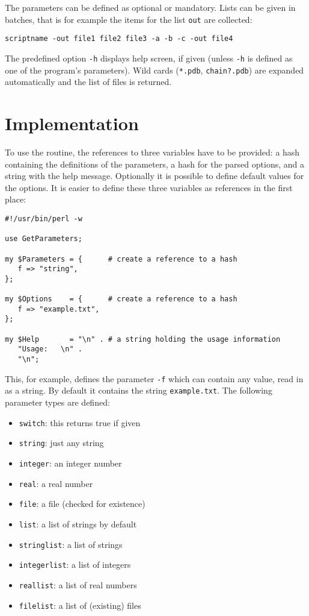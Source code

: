 \documentclass[12pt, a4paper]{article}
\begin{document}
The parameters can be defined as optional or mandatory. Lists can be given in batches, that is for example the items for the list \verb'out' are collected:
\begin{verbatim}
scriptname -out file1 file2 file3 -a -b -c -out file4
\end{verbatim}

The predefined option \verb'-h' displays help screen, if given (unless \verb'-h' is defined as one of the program's parameters).  Wild cards (\verb'*.pdb', \verb'chain?.pdb') are expanded automatically and the list of files is returned.



\newpage

\section{Implementation}

To use the routine, the references to three variables have to be provided: a hash containing the definitions of the parameters, a hash for the parsed options, and a string with the help message. Optionally it is possible to define default values for the options. It is easier to define these three variables as references in the first place:


\begin{verbatim}
#!/usr/bin/perl -w

use GetParameters;

my $Parameters = {      # create a reference to a hash
   f => "string",
};

my $Options    = {      # create a reference to a hash
   f => "example.txt",
};

my $Help       = "\n" . # a string holding the usage information
   "Usage:   \n" .
   "\n";

\end{verbatim}

This, for example, defines the parameter \verb'-f' which can contain any value, read in as a string. By default it contains the string \verb'example.txt'. The following parameter types are defined:

\begin{itemize}
\item \verb'switch':  this returns true if given
\item \verb'string': just any string
\item \verb'integer': an integer number
\item \verb'real': a real number
\item \verb'file': a file (checked for existence)
\item \verb'list': a list of strings by default
\item \verb'stringlist': a list of strings
\item \verb'integerlist': a list of integers
\item \verb'reallist': a list of real numbers
\item \verb'filelist': a list of (existing) files
\end{itemize}
\end{document}

